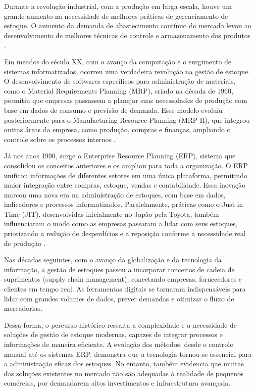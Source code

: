 \documentclass[
	12pt,				%
	openany,			%
	twoside,			%
	a4paper,			%
	english,			%
	brazil				%
	]{abntex2}
\begin{document}
Durante a revolução industrial, com a produção em larga escala, houve um grande aumento na necessidade de melhores práticas de gerenciamento de estoque. O aumento da demanda de abastecimento contínuo do mercado levou ao desenvolvimento de melhores técnicas de controle e armazenamento dos produtos \cite{DIAS2021}.

Em meados do século XX, com o avanço da computação e o surgimento de sistemas informatizados, ocorreu uma verdadeira revolução na gestão de estoque. O desenvolvimento de softwares específicos para administração de materiais, como o Material Requirements Planning (MRP), criado na década de 1960, permitiu que empresas passassem a planejar suas necessidades de produção com base em dados de consumo e previsão de demanda. Esse modelo evoluiu posteriormente para o Manufacturing Resource Planning (MRP II), que integrou outras áreas da empresa, como produção, compras e finanças, ampliando o controle sobre os processos internos \cite{slack2013}.

Já nos anos 1990, surge o Enterprise Resource Planning (ERP), sistema que consolidou os conceitos anteriores e os ampliou para toda a organização. O ERP unificou informações de diferentes setores em uma única plataforma, permitindo maior integração entre compras, estoque, vendas e contabilidade. Essa inovação marcou uma nova era na administração de estoques, com base em dados, indicadores e processos informatizados. Paralelamente, práticas como o Just in Time (JIT), desenvolvidas inicialmente no Japão pela Toyota, também influenciaram o modo como as empresas passaram a lidar com seus estoques, priorizando a redução de desperdícios e a reposição conforme a necessidade real de produção \cite{ohno1997}.

Nas décadas seguintes, com o avanço da globalização e da tecnologia da informação, a gestão de estoques passou a incorporar conceitos de cadeia de suprimentos (supply chain management), conectando empresas, fornecedores e clientes em tempo real. As ferramentas digitais se tornaram indispensáveis para lidar com grandes volumes de dados, prever demandas e otimizar o fluxo de mercadorias.

Dessa forma, o percurso histórico ressalta a complexidade e a necessidade de soluções de gestão de estoque modernas, capazes de integrar processos e informações de maneira eficiente. A evolução dos métodos, desde o controle manual até os sistemas ERP, demonstra que a tecnologia tornou-se essencial para a administração eficaz dos estoques. No entanto, também evidencia que muitas das soluções existentes no mercado não são adequadas à realidade de pequenos comércios, por demandarem altos investimentos e infraestrutura avançada.
\end{document}
